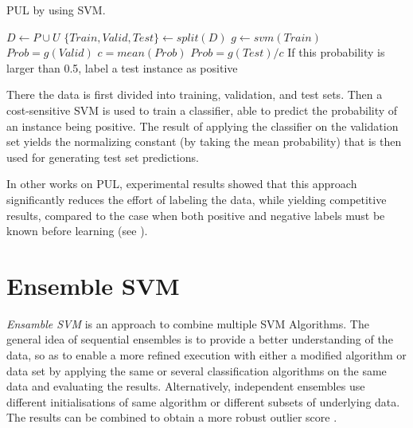\begin{algorithm}[h!]                      
\caption{PUL by using SVM.} 
\label{alg:PUL}                          
    \begin{algorithmic}[1]
        \State $ D\gets P \cup U$ 
        \State $\{Train,Valid,Test\}\gets split(D)$ 
        \State $g \gets svm(Train)$ 
        \State $Prob = g(Valid)$ 
        \State $c = mean(Prob)$  
        \State $Prob = g(Test) / c$ 
        \State If this probability is larger than 0.5, label a test instance as positive
   \end{algorithmic}
\end{algorithm}

There the data is first divided into training, validation, and test sets. Then a cost-sensitive SVM is used to train a classifier, able to predict the probability of an instance being positive. The result of applying the classifier on the validation set yields the normalizing constant (by taking the mean probability) that is then used for generating test set predictions.

In other works on PUL, experimental results showed that this approach significantly reduces the effort of labeling the data, while yielding competitive results, compared to the case when both positive and negative labels must be known before learning (see \cite{Li:2011}).

\section{Ensemble SVM}\label{Chapter:Ensemble}
\textit{Ensamble SVM} is an approach to combine multiple SVM Algorithms. The general idea of sequential ensembles is to provide a better understanding of the data, so as to enable a more refined execution with either a modified algorithm or data set \cite{Aggarwal:2013} by applying the same or several classification algorithms on the same data and evaluating the results. Alternatively, independent ensembles use different initialisations of same algorithm or different subsets of underlying data. The results can be combined to obtain a more robust outlier score \cite{Aggarwal:2013}. 

